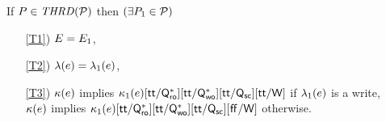 
\noindent
If $\aPS \in \sTHREAD{\aPSS}$ then
$(\exists P_1\in\mathcal{P})$
\begin{enumerate}
\item[\ref{T1})]
  $E=E_1$,
\item[\ref{T2})]
  $\lambda(e) = \lambda_1(e)$,
\item[\ref{T3})]
  $\kappa(e)$ implies
  $\kappa_1(e) [\mathsf{tt}/\mathsf{Q}_{\mathsf{ro}}^{*}][\mathsf{tt}/\mathsf{Q}_{\mathsf{wo}}^{*}][\mathsf{tt}/\mathsf{Q}_{\mathsf{sc}}][\mathsf{tt}/\mathsf{W}]$ if $\lambda_1(e)$ is a write,
  \\
  $\kappa(e)$ implies
  $\kappa_1(e) [\mathsf{tt}/\mathsf{Q}_{\mathsf{ro}}^{*}][\mathsf{tt}/\mathsf{Q}_{\mathsf{wo}}^{*}][\mathsf{tt}/\mathsf{Q}_{\mathsf{sc}}][\mkern.6mu\mathsf{ff}\mkern.6mu/\mathsf{W}]$ otherwise.
\end{enumerate}  
